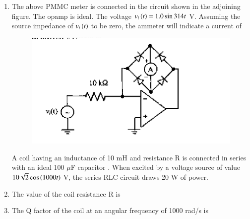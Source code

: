 \documentclass[journal,12pt,onecolumn]{IEEEtran}
\theoremstyle{remark}
\begin{document}
\begin{enumerate}
\item The above PMMC meter is connected in the circuit shown in the adjoining figure. The opamp is ideal. The voltage $v_i\left(t\right) = 1.0 \sin 314t$ V. Assuming the source impedance of $v_i\left(t\right)$ to be zero, the ammeter will indicate a current of
\begin{figure}[H]
    \centering
    \includegraphics[width = 0.7\columnwidth]{q51}
    \caption*{}
    \label{Q51}
\end{figure}

\hfill{}\begin{enumerate}  \end{enumerate}

A coil having an inductance  of 10 mH and resistance R is connected in series with an ideal 100 $\mu$F capacitor . When excited by a voltage source of value $10\sqrt{2} \cos\left(1000t\right)$ V, the series RLC circuit draws 20 W of power.

\item The value of the coil resistance R is
\hfill{}\begin{enumerate}  \end{enumerate}

\item The Q factor of the coil at an angular frequency of 1000 rad/s is
\hfill{}\begin{enumerate}  \end{enumerate}


\end{enumerate}
\end{document}
